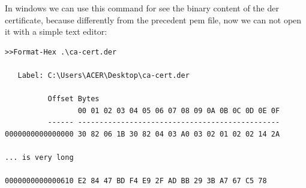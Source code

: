 \documentclass{article}
\begin{document}
In windows we can use this command for see the binary content of the der certificate, because differently from the precedent pem file, now we can not open it with a simple text editor:
\begin{lstlisting}[basicstyle=\tiny]
>>Format-Hex .\ca-cert.der

   Label: C:\Users\ACER\Desktop\ca-cert.der

          Offset Bytes                                           
                 00 01 02 03 04 05 06 07 08 09 0A 0B 0C 0D 0E 0F
          ------ -----------------------------------------------
0000000000000000 30 82 06 1B 30 82 04 03 A0 03 02 01 02 02 14 2A 

... is very long

0000000000000610 E2 84 47 BD F4 E9 2F AD BB 29 3B A7 67 C5 78   
\end{lstlisting}
\end{document}
